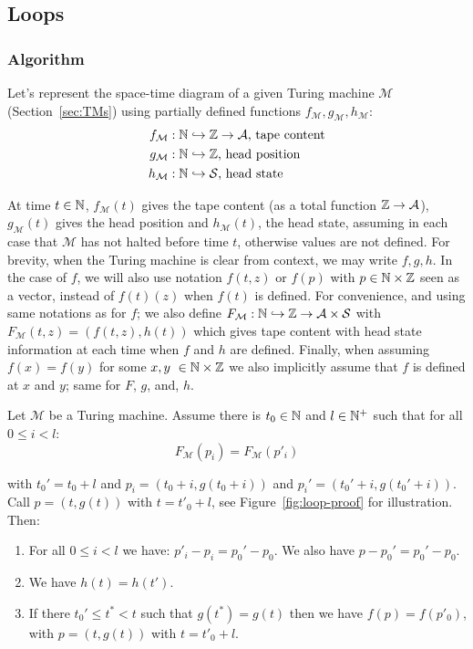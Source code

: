 \newpage
\subsection{Loops}\label{sec:loops}
\subsubsection{Algorithm}

Let's represent the space-time diagram of a given Turing machine $\mathcal{M}$ (Section~\ref{sec:TMs}) using partially defined functions $f_\mathcal{M},g_\mathcal{M},h_\mathcal{M}$:
\begin{align*}
    f_\mathcal{M} & : \mathbb{N} \hookrightarrow \mathbb{Z} \to \mathcal{A}\text{, tape content} \\
    g_\mathcal{M} & : \mathbb{N} \hookrightarrow \mathbb{Z}\text{, head position}              \\
    h_\mathcal{M} & : \mathbb{N} \hookrightarrow \mathcal{S}\text{, head state}
\end{align*}

\newcommand{\baref}{F}

At time $t\in\mathbb{N}$, $f_\mathcal{M}(t)$ gives the tape content (as a total function $\mathbb{Z} \to \mathcal{A}$), $g_\mathcal{M}(t)$ gives the head position and $h_\mathcal{M}(t)$, the head state, assuming in each case that $\mathcal{M}$ has not halted before time $t$, otherwise values are not defined. For brevity, when the Turing machine is clear from context, we may write $f,g,h$. In the case of $f$, we will also use notation $f(t,z)$ or $f(p)$ with $p \in \mathbb{N} \times \mathbb{Z}$ seen as a vector, instead of $f(t)(z)$ when $f(t)$ is defined. For convenience, and using same notations as for $f$; we also define $\baref_\mathcal{M} : \N \hookrightarrow \Z \to \alphabet \times \states$ with $\baref_\mathcal{M}(t,z) = (f(t,z),h(t))$ which gives tape content with head state information at each time when $f$ and $h$ are defined.
Finally, when assuming $f(x) = f(y)$ for some $x,y \in \N \times \Z$ we also implicitly assume that $f$ is defined at $x$ and $y$; same for $\baref$, $g$, and, $h$.


\begin{lemma}\label{lem:vector} Let $\mathcal{M}$ be a Turing machine.
    Assume there is $ t_0 \in \mathbb{N}$ and $l \in \mathbb{N}^+$ such that
    for all $0 \leq i < l$: $$F_\mathcal{M}(p_i)   = F_\mathcal{M}(p'_i)$$

    with $t_0' = t_0+l$ and $p_i = (t_0+i, g(t_0+i))$ and $p_i' = (t_0'+i, g(t_0'+i))$. Call $p=(t,g(t))$ with $t=t'_0 + l$, see Figure~\ref{fig:loop-proof} for illustration. Then:
    \begin{enumerate}
        \item For all $0 \leq i < l$ we have: $p'_i - p_i = p_0' - p_0$. We also have $p - p_0' = p_0' - p_0$. \label{lem:vector:pt1}
        \item We have $h(t) = h(t')$.\label{lem:vector:pt2}
        \item If there $t_0' \leq t^* < t$ such that $g(t^*) = g(t)$ then we have $f(p) = f(p'_0)$, with $p=(t,g(t))$ with $t=t'_0 + l$.\label{lem:vector:pt3}
    \end{enumerate}
\end{lemma}

